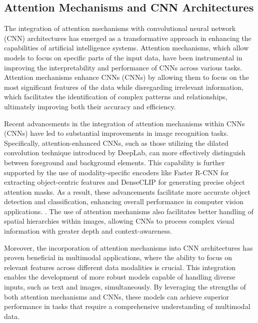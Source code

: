 \subsection{Attention Mechanisms and CNN Architectures} \label{subsec:Attention Mechanisms and CNN Architectures}

The integration of attention mechanisms with convolutional neural network (CNN) architectures has emerged as a transformative approach in enhancing the capabilities of artificial intelligence systems. Attention mechanisms, which allow models to focus on specific parts of the input data, have been instrumental in improving the interpretability and performance of CNNs across various tasks. Attention mechanisms enhance CNNs (CNNs) by allowing them to focus on the most significant features of the data while disregarding irrelevant information, which facilitates the identification of complex patterns and relationships, ultimately improving both their accuracy and efficiency. \cite{park2022attentionmechanismsphysiologicalsignal}



Recent advancements in the integration of attention mechanisms within CNNs (CNNs) have led to substantial improvements in image recognition tasks. Specifically, attention-enhanced CNNs, such as those utilizing the dilated convolution technique introduced by DeepLab, can more effectively distinguish between foreground and background elements. This capability is further supported by the use of modality-specific encoders like Faster R-CNN for extracting object-centric features and DenseCLIP for generating precise object attention masks. As a result, these advancements facilitate more accurate object detection and classification, enhancing overall performance in computer vision applications. \cite{ibtehaz2024fusionregionalsparseattention,hsu2023whatsleftconceptgrounding}. The use of attention mechanisms also facilitates better handling of spatial hierarchies within images, allowing CNNs to process complex visual information with greater depth and context-awareness.



Moreover, the incorporation of attention mechanisms into CNN architectures has proven beneficial in multimodal applications, where the ability to focus on relevant features across different data modalities is crucial. This integration enables the development of more robust models capable of handling diverse inputs, such as text and images, simultaneously. By leveraging the strengths of both attention mechanisms and CNNs, these models can achieve superior performance in tasks that require a comprehensive understanding of multimodal data.



